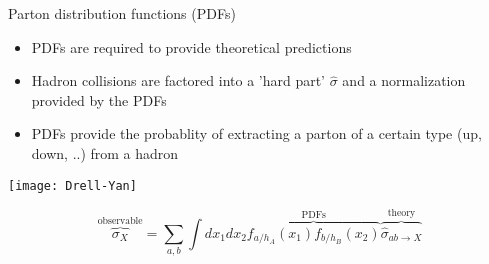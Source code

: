 

%
%
%	
%
%	
%
%

\begin{frame}{Parton distribution functions (PDFs)}

\vspace*{\titleskip}

\begin{itemize}
	\item PDFs are required to provide theoretical predictions	

	\item Hadron collisions are factored into a 'hard part' $\hat{\sigma}$ and a normalization provided by the PDFs	
	
	\item PDFs provide the probablity of extracting a parton of a certain type (up, down, ..) from a hadron  	
	
	
	
	
\end{itemize}

\begin{center}

\texttt{[image: Drell-Yan]}

\vspace{-0.5cm}
$$ \overbrace{\sigma_X}^{\text{observable}}=\sum_{a, b} \int d x_{1} d x_{2} \overbrace{ f_{a / h_{A}}\left(x_{1}\right) f_{b / h_{B}}\left(x_{2}\right)}^{\text{PDFs}} \overbrace{ \hat{\sigma}_{a b \rightarrow X}}^{\text{theory}} $$

\end{center}


\end{frame}

